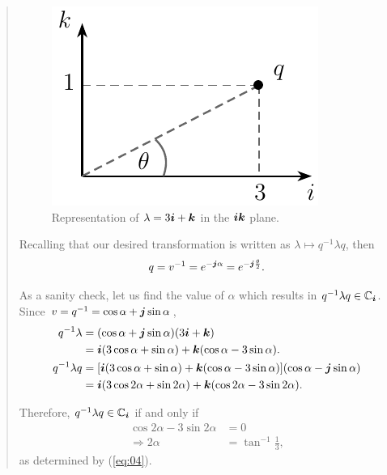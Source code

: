 \begin{quotation}
\begin{example}
        \begin{figure}
            \centering
            \includegraphics[width=0.25\linewidth]{Figures/quaternion01.pdf}
            \caption{Representation of $ \lambda = 3\boldsymbol{i} + \boldsymbol{k} $ in the $ \boldsymbol{i} \boldsymbol{k} $ plane.}
            \label{fig:quat3ik}
        \end{figure}

        Recalling that our desired transformation is written as $ \lambda \mapsto q^{-1} \lambda q $, then
        \begin{equation}
            q = v^{-1} = e^{- \boldsymbol{j} \alpha} = e^{- \boldsymbol{j} \frac{\theta}{2}}.
        \end{equation}

        As a sanity check, let us find the value of $ \alpha $ which results in $ q^{-1} \lambda q \in \mathbb{C}_{\boldsymbol{i}} $. Since $ v = q^{-1} = \cos \alpha + \boldsymbol{j} \sin \alpha $,
        \begin{equation}
            \begin{aligned}
                q^{-1} \lambda   & = (\cos \alpha + \boldsymbol{j} \sin \alpha)(3 \boldsymbol{i} + \boldsymbol{k})                                                          \\
                                 & = \boldsymbol{i}(3 \cos \alpha + \sin \alpha) + \boldsymbol{k}(\cos \alpha - 3 \sin \alpha).                                  \\
                q^{-1} \lambda q & = [\boldsymbol{i}(3 \cos \alpha + \sin \alpha) + \boldsymbol{k}(\cos \alpha - 3 \sin \alpha)] (\cos \alpha - \boldsymbol{j} \sin \alpha) \\
                                 & = \boldsymbol{i} (3 \cos 2\alpha + \sin 2\alpha) + \boldsymbol{k}(\cos 2\alpha - 3 \sin 2\alpha).
            \end{aligned}
        \end{equation}

        Therefore, $ q^{-1} \lambda q \in \mathbb{C}_{\boldsymbol{i}} $ if and only if
        \begin{equation}
            \begin{aligned}\textbf{}
                \cos 2\alpha - 3 \sin 2\alpha & = 0                      \\
                \Rightarrow 2\alpha           & = \tan^{-1} \frac{1}{3},
            \end{aligned}
        \end{equation}
        as determined by (\ref{eq:04}).


\end{example}
\end{quotation}
